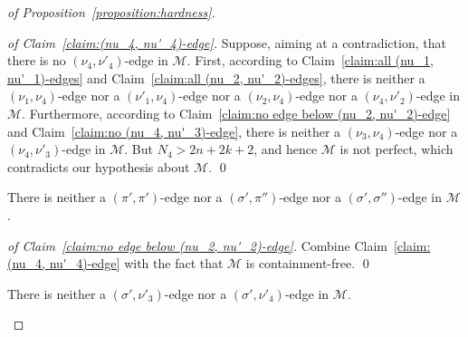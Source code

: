 \documentclass[a4paper]{llncs}
\begin{document}
\begin{proof}[of Proposition~\ref{proposition:hardness}]
  \begin{proof}[of Claim~\ref{claim:(nu_4, nu'_4)-edge}]
    Suppose, aiming at a contradiction, that there is no
    $(\nu_4, \nu'_4)$-edge in $\mathcal{M}$.
    First, according to
    Claim~\ref{claim:all (nu_1, nu'_1)-edges} and
    Claim~\ref{claim:all (nu_2, nu'_2)-edges},
    there is neither a $(\nu_1, \nu_4)$-edge
    nor a $(\nu'_1, \nu_4)$-edge
    nor a $(\nu_2, \nu_4)$-edge
    nor a $(\nu_4, \nu'_2)$-edge in $\mathcal{M}$.
    Furthermore, according to
    Claim~\ref{claim:no edge below (nu_2, nu'_2)-edge} and
    Claim~\ref{claim:no (nu_4, nu'_3)-edge},
    there is neither a $(\nu_3, \nu_4)$-edge
    nor a $(\nu_4, \nu'_3)$-edge in $\mathcal{M}$.
    But $N_4 > 2n + 2k + 2$, and
    hence $\mathcal{M}$ is not perfect,
    which contradicts our hypothesis about $\mathcal{M}$.
    \qed
  \end{proof}

  \begin{claim}
    \label{claim:no edge below (nu_4, nu'_4)-edge}
    There is
    neither a $(\pi', \pi')$-edge
    nor a $(\sigma', \pi'')$-edge
    nor a $(\sigma', \sigma'')$-edge
    in $\mathcal{M}$.
  \end{claim}

  \begin{proof}[of Claim~\ref{claim:no edge below (nu_2, nu'_2)-edge}]
    Combine Claim~\ref{claim:(nu_4, nu'_4)-edge} with the
    fact that $\mathcal{M}$ is containment-free.
    \qed
  \end{proof}

  \begin{claim}
    \label{claim:no (sigma', nu'_3)-edge, no (sigma', nu'_4)-edge}
    There is neither a $(\sigma', \nu'_3)$-edge
    nor a $(\sigma', \nu'_4)$-edge in $\mathcal{M}$.
  \end{claim}


\end{proof}
\end{document}
